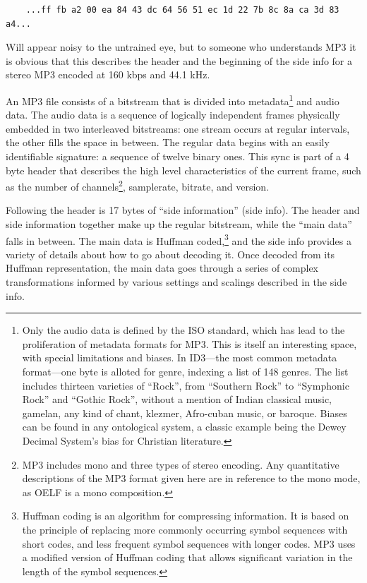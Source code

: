 \documentclass{thesis}
\begin{document}
	\begin{verbatim}
	...ff fb a2 00 ea 84 43 dc 64 56 51 ec 1d 22 7b 8c 8a ca 3d 83 a4...
	\end{verbatim}
	
Will appear noisy to the untrained eye, but to someone who understands MP3 it is obvious that this describes the header and the beginning of the side info for a stereo MP3 encoded at 160 kbps and 44.1 kHz.

An MP3 file consists of a bitstream that is divided into metadata\footnote{Only the audio data is defined by the ISO standard, which has lead to the proliferation of metadata formats for MP3. This is itself an interesting space, with special limitations and biases. In ID3---the most common metadata format---one byte is alloted for genre, indexing a list of 148 genres. The list includes thirteen varieties of ``Rock'', from ``Southern Rock'' to ``Symphonic Rock'' and ``Gothic Rock'', without a mention of Indian classical music, gamelan, any kind of chant, klezmer, Afro-cuban music, or baroque. Biases can be found in any ontological system, a classic example being the Dewey Decimal System's bias for Christian literature.} and audio data. The audio data is a sequence of logically independent frames physically embedded in two interleaved bitstreams: one stream occurs at regular intervals, the other fills the space in between. The regular data begins with an easily identifiable signature: a sequence of twelve binary ones. This sync is part of a 4 byte header that describes the high level characteristics of the current frame, such as the number of channels\footnote{MP3 includes mono and three types of stereo encoding. Any quantitative descriptions of the MP3 format given here are in reference to the mono mode, as OELF is a mono composition.}, samplerate, bitrate, and version.
	
Following the header is 17 bytes of ``side information'' (side info). The header and side information together make up the regular bitstream, while the ``main data'' falls in between. The main data is Huffman coded,\footnote{Huffman coding is an algorithm for compressing information. It is based on the principle of replacing more commonly occurring symbol sequences with short codes, and less frequent symbol sequences with longer codes. MP3 uses a modified version of Huffman coding that allows significant variation in the length of the symbol sequences.} and the side info provides a variety of details about how to go about decoding it. Once decoded from its Huffman representation, the main data goes through a series of complex transformations informed by various settings and scalings described in the side info.
\end{document}
